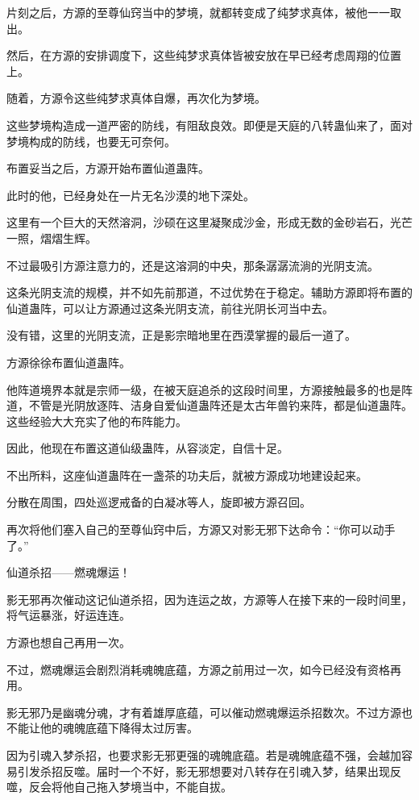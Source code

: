 \begin{this_body}
片刻之后，方源的至尊仙窍当中的梦境，就都转变成了纯梦求真体，被他一一取出。

然后，在方源的安排调度下，这些纯梦求真体皆被安放在早已经考虑周翔的位置上。

随着，方源令这些纯梦求真体自爆，再次化为梦境。

这些梦境构造成一道严密的防线，有阻敌良效。即便是天庭的八转蛊仙来了，面对梦境构成的防线，也要无可奈何。

布置妥当之后，方源开始布置仙道蛊阵。

此时的他，已经身处在一片无名沙漠的地下深处。

这里有一个巨大的天然溶洞，沙硕在这里凝聚成沙金，形成无数的金砂岩石，光芒一照，熠熠生辉。

不过最吸引方源注意力的，还是这溶洞的中央，那条潺潺流淌的光阴支流。

这条光阴支流的规模，并不如先前那道，不过优势在于稳定。辅助方源即将布置的仙道蛊阵，可以让方源通过这条光阴支流，前往光阴长河当中去。

没有错，这里的光阴支流，正是影宗暗地里在西漠掌握的最后一道了。

方源徐徐布置仙道蛊阵。

他阵道境界本就是宗师一级，在被天庭追杀的这段时间里，方源接触最多的也是阵道，不管是光阴放逐阵、洁身自爱仙道蛊阵还是太古年兽钓来阵，都是仙道蛊阵。这些经验大大充实了他的布阵能力。

因此，他现在布置这道仙级蛊阵，从容淡定，自信十足。

不出所料，这座仙道蛊阵在一盏茶的功夫后，就被方源成功地建设起来。

分散在周围，四处巡逻戒备的白凝冰等人，旋即被方源召回。

再次将他们塞入自己的至尊仙窍中后，方源又对影无邪下达命令：“你可以动手了。”

仙道杀招——燃魂爆运！

影无邪再次催动这记仙道杀招，因为连运之故，方源等人在接下来的一段时间里，将气运暴涨，好运连连。

方源也想自己再用一次。

不过，燃魂爆运会剧烈消耗魂魄底蕴，方源之前用过一次，如今已经没有资格再用。

影无邪乃是幽魂分魂，才有着雄厚底蕴，可以催动燃魂爆运杀招数次。不过方源也不能让他的魂魄底蕴下降得太过厉害。

因为引魂入梦杀招，也要求影无邪更强的魂魄底蕴。若是魂魄底蕴不强，会越加容易引发杀招反噬。届时一个不好，影无邪想要对八转存在引魂入梦，结果出现反噬，反会将他自己拖入梦境当中，不能自拔。


\end{this_body}
